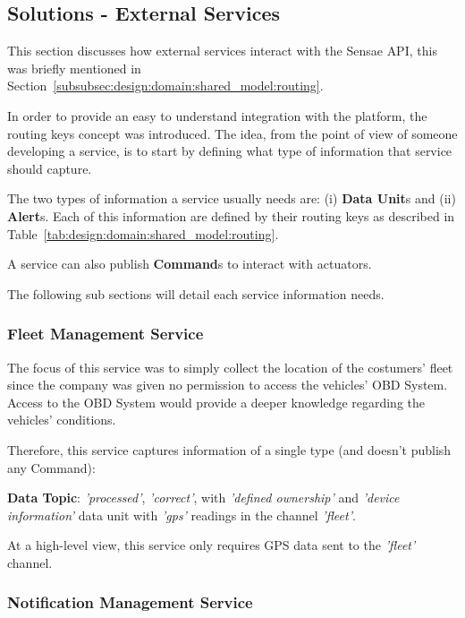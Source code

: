 \subsection{Solutions - External Services}
\label{subsec:implementation:description:services}

This section discusses how external services interact with the Sensae \gls{API}, this was briefly mentioned in Section~\ref{subsubsec:design:domain:shared_model:routing}.

In order to provide an easy to understand integration with the platform, the routing keys concept was introduced. The idea, from the point of view of someone developing a service, is to start by defining what type of information that service should capture.

The two types of information a service usually needs are: (i) \textbf{Data Unit}s and (ii) \textbf{Alert}s. Each of this information are defined by their routing keys as described in Table~\ref{tab:design:domain:shared_model:routing}.

A service can also publish \textbf{Command}s to interact with actuators.

The following sub sections will detail each service information needs.

\subsubsection{Fleet Management Service}
\label{subsubsec:implementation:description:services:fleet}

The focus of this service was to simply collect the location of the costumers' fleet since the company was given no permission to access the vehicles' \gls{OBD} System. Access to the \gls{OBD} System would provide a deeper knowledge regarding the vehicles' conditions.

Therefore, this service captures information of a single type (and doesn't publish any Command):

\textbf{Data Topic}: \textit{'processed'}, \textit{'correct'}, with \textit{'defined ownership'} and \textit{'device information'} data unit with \textit{'gps'} readings in the channel \textit{'fleet'}.

At a high-level view, this service only requires \gls{GPS} data sent to the \textit{'fleet'} channel.

\subsubsection{Notification Management Service}
\label{subsubsec:implementation:description:services:notification}

